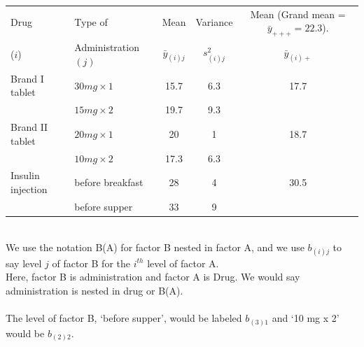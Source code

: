 \begin{center}
\begin{tabular}{|llccc|} \hline
Drug & Type of & Mean & Variance & Mean (Grand mean = $\bar{y}_{+++}=22.3$).\\
($i$) & Administration $(j)$ & $\bar{y}_{(i)j}$ & $s_{(i)j}^2$ & $\bar{y}_{(i)+}$\\ \hline
Brand I tablet & $30 mg \times 1$ & 15.7 & 6.3 & 17.7\\
& $15 mg \times 2$ & 19.7 & 9.3 & \\
Brand II tablet & $20 mg \times 1$ & 20 & 1 & 18.7 \\
& $10 mg \times 2$ & 17.3 & 6.3 & \\
Insulin injection & before breakfast  & 28  & 4 & 30.5\\
& before supper & 33 & 9 & \\ \hline
\end{tabular}
\end{center}
~\\
We use the notation B(A) for factor B nested in factor A, and we use $b_{(i)j}$ to say level $j$ of factor B for the $i^{th}$ level of factor A.  \\
Here, factor B is administration and factor A is Drug.  We would say administration is nested in drug or B(A).  \\~\\
The level of factor B, `before supper', would be labeled $b_{(3)1}$ and `10 mg x 2' would be $b_{(2)2}$.\\~\\

